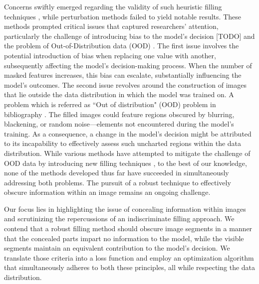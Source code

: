 Concerns swiftly emerged regarding the validity of such heuristic filling techniques \citep{hsieh2021evaluations, kindermans2017unreliability}, while perturbation methods failed to yield notable results. These methods prompted critical issues that captured researchers' attention, particularly the challenge of introducing bias to the model's decision [TODO] and the problem of Out-of-Distribution data (OOD) \citep{gomez2022metrics, hase2021outofdistribution, qiu2021resisting}. The first issue involves the potential introduction of bias when replacing one value with another, subsequently affecting the model's decision-making process. When the number of masked features increases, this bias can escalate, substantially influencing the model's outcomes. The second issue revolves around the construction of images that lie outside the data distribution in which the model was trained on. A problem which is referred as ``Out of distribution" (OOD) problem in bibliography \citep{qiu2021resisting, janzing20a}. The filled images could feature regions obscured by blurring, blackening, or random noise—elements not encountered during the model's training. As a consequence, a change in the model's decision might be attributed to its incapability to effectively assess such uncharted regions within the data distribution. While various methods have attempted to mitigate the challenge of OOD data by introducing new filling techniques \citep{jethani2021learned, yoon2018invase, chen2018learning}, to the best of our knowledge, none of the methods developed thus far have succeeded in simultaneously addressing both problems. The pursuit of a robust technique to effectively obscure information within an image remains an ongoing challenge.

Our focus lies in highlighting the issue of concealing information within images and scrutinizing the repercussions of an indiscriminate filling approach. We contend that a robust filling method should obscure image segments in a manner that the concealed parts impart no information to the model, while the visible segments maintain an equivalent contribution to the model's decision. We translate those criteria into a loss function and employ an optimization algorithm that simultaneously adheres to both these principles, all while respecting the data distribution. \newline

